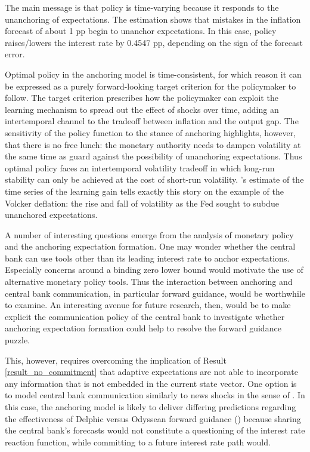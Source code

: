 \documentclass[11pt]{article}
\renewcommand{\[}{\begin{equation}}
\renewcommand{\]}{\end{equation}}
\def\ppFEunanchors{1 }
\def\ppMoveFFR{0.4547 }
\begin{document}
The main message is that policy is time-varying because it responds to the unanchoring of expectations. The estimation shows that mistakes in the inflation forecast of about \ppFEunanchors pp begin to unanchor expectations. In this case, policy raises/lowers the interest rate by \ppMoveFFR pp, depending on the sign of the forecast error.

Optimal policy in the anchoring model is time-consistent, for which reason it can be expressed as a purely forward-looking target criterion for the policymaker to follow. The target criterion prescribes how the policymaker can exploit the learning mechanism to spread out the effect of shocks over time, adding an intertemporal channel to the tradeoff between inflation and the output gap. The sensitivity of the policy function to the stance of anchoring highlights, however, that there is no free lunch: the monetary authority needs to dampen volatility at the same time as guard against the possibility of unanchoring expectations. Thus optimal policy faces an intertemporal volatility tradeoff in which long-run stability can only be achieved at the cost of short-run volatility. \cite{carvalho2019anchored}'s estimate of the time series of the learning gain tells exactly this story on the example of the Volcker deflation: the rise and fall of volatility as the Fed sought to subdue unanchored expectations. 

A number of interesting questions emerge from the analysis of monetary policy and the anchoring expectation formation. One may wonder whether the central bank can use tools other than its leading interest rate to anchor expectations. Especially concerns around a binding zero lower bound would motivate the use of alternative monetary policy tools. Thus the interaction between anchoring and central bank communication, in particular forward guidance, would be worthwhile to examine. An interesting avenue for future research, then, would be to make explicit the communication policy of the central bank to investigate whether anchoring expectation formation could help to resolve the forward guidance puzzle. 

This, however, requires overcoming the implication of Result \ref{result_no_commitment} that adaptive expectations are not able to incorporate any information that is not embedded in the current state vector. One option is to model central bank communication similarly to news shocks in the sense of \cite{beaudry2006stock}. In this case, the anchoring model is likely to deliver differing predictions regarding the effectiveness of Delphic versus Odyssean forward guidance (\cite{campbell2012macroeconomic}) because sharing the central bank's forecasts would not constitute a questioning of the interest rate reaction function, while committing to a future interest rate path would.
\end{document}
